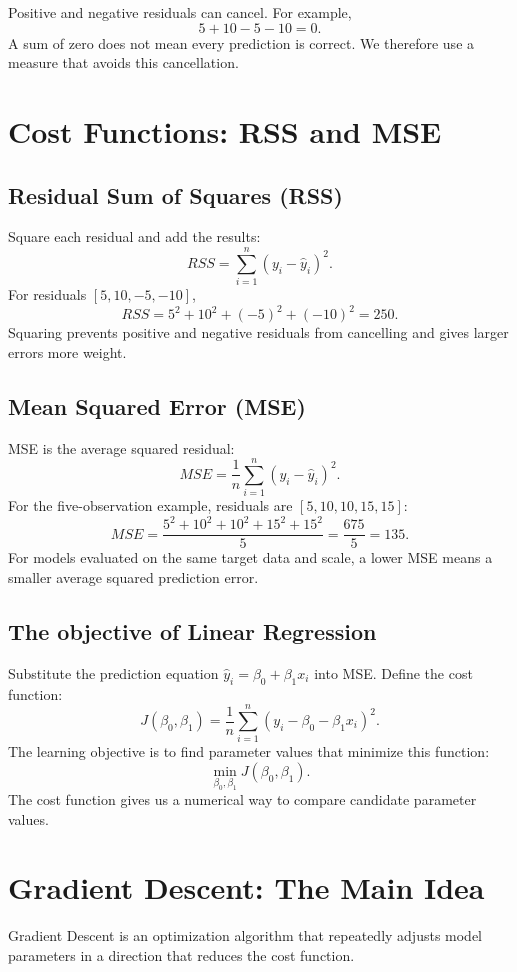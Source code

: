 \documentclass[11pt,a4paper]{article}
\begin{document}
Positive and negative residuals can cancel. For example,
\[
5+10-5-10=0.
\]
A sum of zero does not mean every prediction is correct. We therefore use a measure that avoids this cancellation.

\section{Cost Functions: RSS and MSE}

\subsection{Residual Sum of Squares (RSS)}

Square each residual and add the results:
\[
\boxed{RSS=\sum_{i=1}^{n}(y_i-\hat y_i)^2.}
\]
For residuals $[5,10,-5,-10]$,
\[
RSS=5^2+10^2+(-5)^2+(-10)^2=250.
\]
Squaring prevents positive and negative residuals from cancelling and gives larger errors more weight.

\subsection{Mean Squared Error (MSE)}

MSE is the average squared residual:
\[
\boxed{MSE=\frac{1}{n}\sum_{i=1}^{n}(y_i-\hat y_i)^2.}
\]
For the five-observation example, residuals are $[5,10,10,15,15]$:
\[
MSE=\frac{5^2+10^2+10^2+15^2+15^2}{5}
=\frac{675}{5}=\boxed{135}.
\]
For models evaluated on the same target data and scale, a lower MSE means a smaller average squared prediction error.

\subsection{The objective of Linear Regression}

Substitute the prediction equation $\hat y_i=\beta_0+\beta_1x_i$ into MSE. Define the cost function:
\[
\boxed{
J(\beta_0,\beta_1)=
\frac{1}{n}\sum_{i=1}^{n}
(y_i-\beta_0-\beta_1x_i)^2.
}
\]
The learning objective is to find parameter values that minimize this function:
\[
\boxed{\min_{\beta_0,\beta_1}J(\beta_0,\beta_1).}
\]
The cost function gives us a numerical way to compare candidate parameter values.

\section{Gradient Descent: The Main Idea}

Gradient Descent is an optimization algorithm that repeatedly adjusts model parameters in a direction that reduces the cost function.
\end{document}
